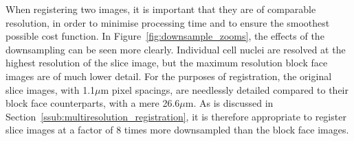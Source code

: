 	 When registering two images, it is important that they are of comparable resolution, in order to minimise processing time and to ensure the smoothest possible cost function. In Figure~\ref{fig:downsample_zooms}, the effects of the downsampling can be seen more clearly. Individual cell nuclei are resolved at the highest resolution of the slice image, but the maximum resolution block face images are of much lower detail. For the purposes of registration, the original slice images, with 1.1$\mu$m pixel spacings, are needlessly detailed compared to their block face counterparts, with a mere 26.6$\mu$m. As is discussed in Section~\ref{ssub:multiresolution_registration}, it is therefore appropriate to register slice images at a factor of 8 times more downsampled than the block face images.
    
    \begin{figure}
      \centering

\end{figure}
